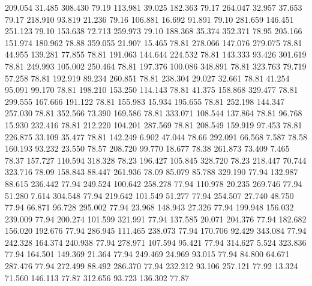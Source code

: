  209.054   31.485  308.430        79.19
 113.981   39.025  182.363        79.17
 264.047   32.957   37.653        79.17
 218.910   93.819   21.236        79.16
 106.881   16.692   91.891        79.10
 281.659  146.451  251.123        79.10
 153.638   72.713  259.973        79.10
 188.368   35.374  352.371        78.95
 205.166  151.974  180.962        78.88
 359.055   21.907   15.465        78.81
 278.066  147.076  279.075        78.81
  44.955  139.281   77.855        78.81
 191.063  144.644  224.532        78.81
 143.333   93.426  301.619        78.81
 249.993  105.002  250.464        78.81
 197.376  100.086  348.891        78.81
 323.763   79.719   57.258        78.81
 192.919   89.234  260.851        78.81
 238.304   29.027   32.661        78.81
  41.254   95.091   99.170        78.81
 198.210  153.250  114.143        78.81
  41.375  158.868  329.477        78.81
 299.555  167.666  191.122        78.81
 155.983   15.934  195.655        78.81
 252.198  144.347  257.030        78.81
 352.566   73.390  169.586        78.81
 333.071  108.544  137.864        78.81
  96.768   15.930  232.416        78.81
 212.220  104.201  287.569        78.81
 208.549  159.919   97.453        78.81
 226.875   33.109   35.477        78.81
 142.249    6.902   47.044        78.66
 292.091   66.568    7.587        78.58
 160.193   93.232   23.550        78.57
 208.720   99.770   18.677        78.38
 261.873   73.409    7.465        78.37
 157.727  110.594  318.328        78.23
 196.427  105.845  328.720        78.23
 218.447   70.744  323.716        78.09
 158.843   88.447  261.936        78.09
  85.079   85.788  329.190        77.94
 132.987   88.615  236.442        77.94
 249.524  100.642  258.278        77.94
 110.978   20.235  269.746        77.94
  51.280    7.614  304.548        77.94
 219.642  101.549   51.277        77.94
 254.507   27.740   48.750        77.94
  66.871   96.728  295.002        77.94
  23.968  148.943   27.326        77.94
 199.948  156.032  239.009        77.94
 200.274  101.599  321.991        77.94
 137.585   20.071  204.376        77.94
 182.682  156.020  192.676        77.94
 286.945  111.465  238.073        77.94
 170.706   92.429  343.084        77.94
 242.328  164.374  240.938        77.94
 278.971  107.594   95.421        77.94
 314.627    5.524  323.836        77.94
 164.501  149.369   21.364        77.94
 249.469   24.969   93.015        77.94
  84.800   64.671  287.476        77.94
 272.499   88.492  286.370        77.94
 232.212   93.106  257.121        77.92
  13.324   71.560  146.113        77.87
 312.656   93.723  136.302        77.87
